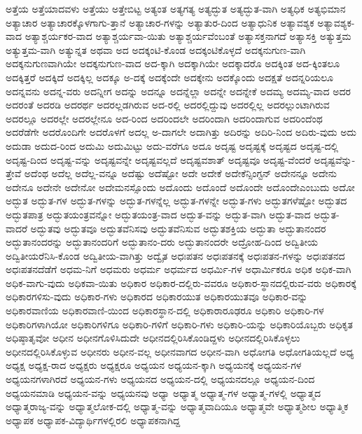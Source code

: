 {ಅತ್ತೆಯ
ಅತ್ತೆಯಾದವಳು
ಅತ್ತೆಯು
ಅತ್ತೇಬಿಟ್ಟ
ಅತ್ಯಂತ
ಅತ್ಯಗತ್ಯ
ಅತ್ಯದ್ಭುತ
ಅತ್ಯದ್ಭುತ-ವಾಗಿ
ಅತ್ಯಧಿಕ
ಅತ್ಯಭಿಮಾನ
ಅತ್ಯಾಚಾರ
ಅತ್ಯಾಚಾರಕ್ಕೊಳಗಾಗು-ತ್ತಾನೆ
ಅತ್ಯಾಚಾರ-ಗಳನ್ನು
ಅತ್ಯಾತುರ-ದಿಂದ
ಅತ್ಯಾಧುನಿಕ
ಅತ್ಯಾವಶ್ಯಕ
ಅತ್ಯಾವಶ್ಯಕ-ವಾದ
ಅತ್ಯಾಶ್ಚರ್ಯಕರ-ವಾದ
ಅತ್ಯಾಶ್ಚರ್ಯವಾ-ಯಿತು
ಅತ್ಯಾಶ್ಚರ್ಯವೆಂಬಂತೆ
ಅತ್ಯಾಸಕ್ತನಾಗದೆ
ಅತ್ಯಾಸಕ್ತಿ
ಅತ್ಯುತ್ತಮ
ಅತ್ಯುತ್ತಮ-ವಾಗಿ
ಅತ್ಯುನ್ನತ
ಅಥವಾ
ಅದ
ಅದಕ್ಕಂಟಿ-ಕೊಂಡ
ಅದಕ್ಕಂಟಿಕೊಳ್ಳದೆ
ಅದಕ್ಕನುಗುಣ-ವಾಗಿ
ಅದಕ್ಕನುಗುಣವಾಗಿಯೇ
ಅದಕ್ಕನುಗುಣ-ವಾದ
ಅದ-ಕ್ಕಾಗಿ
ಅದಕ್ಕಾಗಿಯೇ
ಅದಕ್ಕಾದರೊ
ಅದಕ್ಕಿಂತ
ಅದ-ಕ್ಕಿಂತಲೂ
ಅದಕ್ಕಿತ್ತರೆ
ಅದಕ್ಕಿದೆ
ಅದಕ್ಕಿಲ್ಲ
ಅದಕ್ಕೂ
ಅ-ದಕ್ಕೆ
ಅದಕ್ಕೆಂದೇ
ಅದಕ್ಕೇನು
ಅದಕ್ಕೊಂದು
ಅದಕ್ಷತೆ
ಅದನ್ನರಿಯಲೂ
ಅದನ್ನವನು
ಅದನ್ನ-ವರು
ಅದನ್ನೀಗ
ಅದನ್ನು
ಅದನ್ನೂ
ಅದನ್ನೆಲ್ಲಾ
ಅದನ್ನೇ
ಅದನ್ನೇಕೆ
ಅದಮ್ಯ
ಅದಮ್ಯ-ವಾದ
ಅದರ
ಅದರಂತೆ
ಅದರಡಿ
ಅದರರ್ಥ
ಅದರಲ್ಲಡಗಿರುವ
ಅದ-ರಲ್ಲಿ
ಅದರಲ್ಲಿದ್ದುವು
ಅದರಲ್ಲಿಲ್ಲ
ಅದರಲ್ಲುಂಟಾಗಿರುವ
ಅದರಲ್ಲೂ
ಅದರಲ್ಲೇ
ಅದರಲ್ಲೇನೂ
ಅದ-ರಿಂದ
ಅದರಿಂದಲೇ
ಅದರಿಂದಾಗಿ
ಅದರಿಂದಾಗುವ
ಅದರಿಂದೆಂಥ
ಅದರೆಡೆಗೇ
ಅದರೊಂದಿಗೇ
ಅದರೊಳಗೆ
ಅದಲ್ಲ
ಅ-ದಾಗಲೇ
ಅದಾಗಿತ್ತು
ಅದಿರನ್ನು
ಅದಿರಿ-ನಿಂದ
ಅದಿರು-ವುದು
ಅದು
ಅದುಡಾ
ಅದುದ-ರಿಂದ
ಅದುಮಿ
ಅದುಮಿಟ್ಟು
ಅದು-ವರೆಗೂ
ಅದೂ
ಅದೃಷ್ಟ
ಅದೃಷ್ಟಕ್ಕೆ
ಅದೃಷ್ಟದ
ಅದೃಷ್ಟ-ದಲ್ಲಿ
ಅದೃಷ್ಟ-ದಿಂದ
ಅದೃಷ್ಟ-ವನ್ನು
ಅದೃಷ್ಟವನ್ನೇ
ಅದೃಷ್ಟವಲ್ಲದೆ
ಅದೃಷ್ಟವಶಾತ್
ಅದೃಷ್ಟವೂ
ಅದೃಷ್ಟ-ವೆಂದರೆ
ಅದೃಷ್ಟವೆನ್ನು-ತ್ತೇವೆ
ಅದೆಂಥ
ಅದೆಲ್ಲ
ಅದೆಲ್ಲ-ವನ್ನೂ
ಅದೆಷ್ಟು
ಅದೆಷ್ಟೋ
ಅದೇ
ಅದೇಕೆ
ಅದೇಕೆನ್ಸಿಂಗ್ಟನ್
ಅದೇನನ್ನೂ
ಅದೇನು
ಅದೇನೂ
ಅದೇನೇ
ಅದೇನೋ
ಅದೇಮನಸ್ಸೊಂದು
ಅದೊಂದು
ಅದೊಂದೆ
ಅದೊಂದೇ
ಅದೊಂದೇಎಂಬುದು
ಅದೋ
ಅದ್ಭುತ
ಅದ್ಭುತ-ಗಳ
ಅದ್ಭುತ-ಗಳನ್ನು
ಅದ್ಭುತ-ಗಳನ್ನೆಲ್ಲ
ಅದ್ಭುತ-ಗಳನ್ನೇ
ಅದ್ಭುತ-ಗಳು
ಅದ್ಭುತಗಳೆಷ್ಟೋ
ಅದ್ಭುತದ
ಅದ್ಭುತಪಾತ್ರ
ಅದ್ಭುತಯಂತ್ರವನ್ನೋ
ಅದ್ಭುತಯಂತ್ರ-ವಾದ
ಅದ್ಭುತ-ವನ್ನು
ಅದ್ಭುತ-ವಾಗಿ
ಅದ್ಭುತ-ವಾದ
ಅದ್ಭುತ-ವಾದರೆ
ಅದ್ಭುತವು
ಅದ್ಭುತವೂ
ಅದ್ಭುತವೆನಿಸವು
ಅದ್ಭುತವೆನಿಸುವ
ಅದ್ಭುತಶಕ್ತಿಯ
ಅದ್ಭುತಾ
ಅದ್ಭುತಾನಂದರ
ಅದ್ಭುತಾನಂದರನ್ನು
ಅದ್ಭುತಾನಂದರಿಗೆ
ಅದ್ಭುತಾನಂ-ದರು
ಅದ್ಭುತಾನಂದರೇ
ಅದ್ರೋಹ-ದಿಂದ
ಅದ್ವಿತೀಯ
ಅದ್ವಿತೀಯರೆನಿಸಿ-ಕೊಂಡ
ಅದ್ವಿತೀಯ-ವಾಗಿತ್ತು
ಅದ್ವೈತ
ಅಧಃಪತನ
ಅಧಃಪತನಕ್ಕೆ
ಅಧಃಪತನ-ಗಳನ್ನು
ಅಧಃಪತನದ
ಅಧಃಪತನದೆಡೆಗೆ
ಅಧಮ-ನಿಗೆ
ಅಧಮರು
ಅಧರ್ಮ
ಅಧರ್ಮದ
ಅಧರ್ಮಿ-ಗಳ
ಅಧಾರ್ಮಿಕರೂ
ಅಧಿಕ
ಅಧಿಕ-ವಾಗಿ
ಅಧಿಕ-ವಾಗು-ವುದು
ಅಧಿಕವಾ-ಯಿತು
ಅಧಿಕಾರ
ಅಧಿಕಾರ-ದಲ್ಲಿರು-ವವರೂ
ಅಧಿಕಾರ-ಸ್ಥಾನದಲ್ಲಿರುವ-ವರು
ಅಧಿಕಾರಕ್ಕೆ
ಅಧಿಕಾರಗಳಿಸು-ವುದು
ಅಧಿಕಾರ-ಗಳು
ಅಧಿಕಾರದ
ಅಧಿಕಾರಯುತ
ಅಧಿಕಾರಯುತವೂ
ಅಧಿಕಾರ-ವನ್ನು
ಅಧಿಕಾರವಾಣಿಯ
ಅಧಿಕಾರವಾಣಿ-ಯಿಂದ
ಅಧಿಕಾರಸ್ಥಾನ-ದಲ್ಲಿ
ಅಧಿಕಾರಾರೂಢರೂ
ಅಧಿಕಾರಿ
ಅಧಿಕಾರಿ-ಗಳ
ಅಧಿಕಾರಿಗಳಾಗಿಯೋ
ಅಧಿಕಾರಿಗಳಿಗೂ
ಅಧಿಕಾರಿ-ಗಳಿಗೆ
ಅಧಿಕಾರಿ-ಗಳು
ಅಧಿಕಾರಿ-ಯನ್ನು
ಅಧಿಕಾರಿಯೊಬ್ಬರು
ಅಧಿಕೃತ
ಅಧಿಷ್ಠಾತೃವೋ
ಅಧೀನ
ಅಧೀನಗೊಳಿಸಿದುದೇ
ಅಧೀನದಲ್ಲಿರಿಸಿಕೊಂಡಿದ್ದಳು
ಅಧೀನದಲ್ಲಿರಿಸಿಕೊಳ್ಳಲು
ಅಧೀನದಲ್ಲಿರಿಸಿಕೊಳ್ಳುವ
ಅಧೀನರು
ಅಧೀನ-ವಲ್ಲ
ಅಧೀನವಾಗದ
ಅಧೀನ-ವಾಗಿ
ಅಧೋಗತಿ
ಅಧೋಗತಿಯಲ್ಲದೆ
ಅಧ್ಯ
ಅಧ್ಯಕ್ಷ
ಅಧ್ಯಕ್ಷ-ರಾದ
ಅಧ್ಯಕ್ಷರು
ಅಧ್ಯಕ್ಷರೂ
ಅಧ್ಯಯನ
ಅಧ್ಯಯನ-ಕ್ಕಾಗಿ
ಅಧ್ಯಯನಕ್ಕೆ
ಅಧ್ಯಯನ-ಗಳ
ಅಧ್ಯಯನಗಳಾಗಿರದೆ
ಅಧ್ಯಯನ-ಗಳು
ಅಧ್ಯಯನದ
ಅಧ್ಯಯನ-ದಲ್ಲಿ
ಅಧ್ಯಯನದಲ್ಲೂ
ಅಧ್ಯಯನ-ದಿಂದ
ಅಧ್ಯಯನಮಾಡಿ
ಅಧ್ಯಯನ-ವನ್ನು
ಅಧ್ಯಯನವು
ಅಧ್ಯಾ
ಅಧ್ಯಾತ್ಮ
ಅಧ್ಯಾತ್ಮ-ಗಳ
ಅಧ್ಯಾತ್ಮ-ಗಳಲ್ಲಿ
ಅಧ್ಯಾತ್ಮದ
ಅಧ್ಯಾತ್ಮರಾಜ್ಯ-ವನ್ನು
ಅಧ್ಯಾತ್ಮಲೋಕ-ದಲ್ಲಿ
ಅಧ್ಯಾತ್ಮ-ವನ್ನು
ಅಧ್ಯಾತ್ಮವಾದಿಯೂ
ಅಧ್ಯಾತ್ಮವೇ
ಅಧ್ಯಾತ್ಮಶೀಲ
ಅಧ್ಯಾತ್ಮಿಕ
ಅಧ್ಯಾಪಕ
ಅಧ್ಯಾಪಕ-ವಿದ್ಯಾರ್ಥಿಗಳಲ್ಲಿರಲಿ
ಅಧ್ಯಾಪಕನಾಗಿದ್ದ
}
